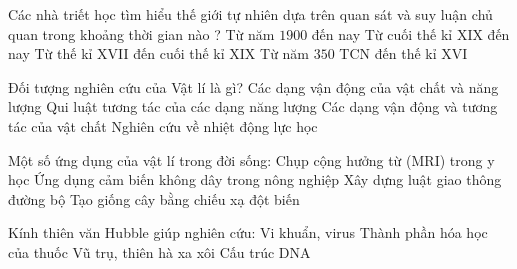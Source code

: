 \begin{ex}
Các nhà triết học tìm hiểu thế giới tự nhiên dựa trên quan sát và suy luận chủ quan trong khoảng thời gian nào ?
\choice
{Từ năm $1900$ đến nay}
{Từ cuối thế kỉ XIX đến nay}
{Từ thế kỉ XVII đến cuối thế kỉ XIX}
{\True Từ năm $350$ TCN đến thế kỉ XVI}
\end{ex}

\begin{ex}
Đối tượng nghiên cứu của Vật lí là gì?
\choice
{\True Các dạng vận động của vật chất và năng lượng}
{Qui luật tương tác của các dạng năng lượng}
{Các dạng vận động và tương tác của vật chất}
{Nghiên cứu về nhiệt động lực học}
\end{ex}

\begin{ex}
Một số ứng dụng của vật lí trong đời sống:
\choiceTF
{\True Chụp cộng hưởng từ (MRI) trong y học}
{\True Ứng dụng cảm biến không dây trong nông nghiệp}
{Xây dựng luật giao thông đường bộ}
{\True Tạo giống cây bằng chiếu xạ đột biến}
\end{ex}


\begin{ex}
Kính thiên văn Hubble giúp nghiên cứu:
\choice
{Vi khuẩn, virus}
{Thành phần hóa học của thuốc}
{\True Vũ trụ, thiên hà xa xôi}
{Cấu trúc DNA}
\end{ex}

